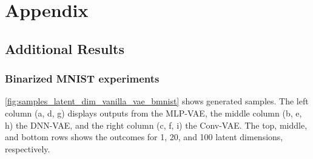 \section{Appendix}\label{sec:Appendix A}



\subsection{Additional Results}\label{app:additional_results}

\subsubsection*{Binarized MNIST experiments}

\autoref{fig:samples_latent_dim_vanilla_vae_bmnist} shows generated samples. The left column (a, d, g) displays outputs from the MLP-VAE, the middle column (b, e, h) the DNN-VAE, and the right column (c, f, i) the Conv-VAE. The top, middle, and bottom rows shows the outcomes for 1, 20, and 100 latent dimensions, respectively. 

